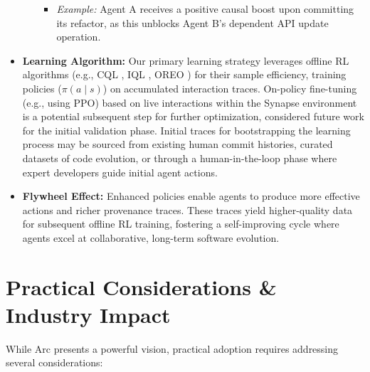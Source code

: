 \documentclass{article}
\begin{document}
\begin{itemize}
\begin{itemize}
        \begin{itemize}
            \item \textit{Example:} Agent A receives a positive causal boost upon committing its refactor, as this unblocks Agent B's dependent API update operation.
        \end{itemize}
    \end{itemize}
    \item \textbf{Learning Algorithm:} Our primary learning strategy leverages offline RL algorithms (e.g., CQL \cite{ref46}, IQL \cite{ref11}, OREO \cite{ref48}) for their sample efficiency, training policies ($\pi(a\mid s)$) on accumulated interaction traces. On-policy fine-tuning (e.g., using PPO) based on live interactions within the Synapse environment is a potential subsequent step for further optimization, considered future work for the initial validation phase. Initial traces for bootstrapping the learning process may be sourced from existing human commit histories, curated datasets of code evolution, or through a human-in-the-loop phase where expert developers guide initial agent actions.
    \item \textbf{Flywheel Effect:} Enhanced policies enable agents to produce more effective actions and richer provenance traces. These traces yield higher-quality data for subsequent offline RL training, fostering a self-improving cycle where agents excel at collaborative, long-term software evolution.
\end{itemize}

\section{Practical Considerations \& Industry Impact}
While Arc presents a powerful vision, practical adoption requires addressing several considerations:
\end{document}

